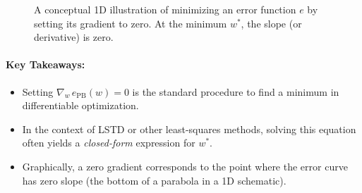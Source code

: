\begin{figure}[ht]
\centering
{}
\caption{A conceptual 1D illustration of minimizing an error function $e$ by setting its gradient to zero. 
At the minimum $w^*$, the slope (or derivative) is zero.}
\label{fig:grad_zero}
\end{figure}

\paragraph{Key Takeaways:}
\begin{itemize}
    \item Setting \(\nabla_w \, e_{\mathrm{PB}}(w) = 0\) is the standard procedure to find a minimum in differentiable optimization.
    \item In the context of LSTD or other least-squares methods, solving this equation often yields a \emph{closed-form} expression for \(w^*\).
    \item Graphically, a zero gradient corresponds to the point where the error curve has zero slope (the bottom of a parabola in a 1D schematic).
\end{itemize}

